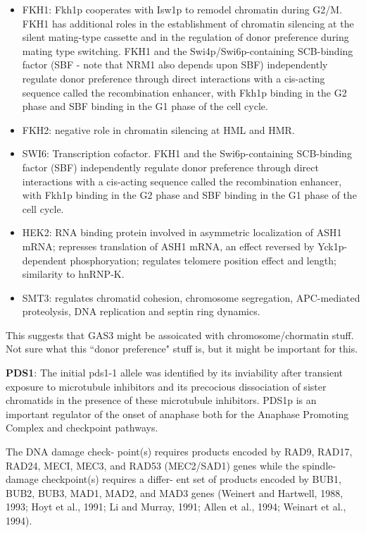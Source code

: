 \documentclass[]{article}
\begin{document}
\begin{itemize}
	\item FKH1: Fkh1p cooperates with Isw1p to remodel chromatin during G2/M. FKH1 has additional roles in the establishment of chromatin silencing at the silent mating-type cassette and in the regulation of donor preference during mating type switching. FKH1 and the Swi4p/Swi6p-containing SCB-binding factor (SBF - note that NRM1 also depends upon SBF) independently regulate donor preference through direct interactions with a cis-acting sequence called the recombination enhancer, with Fkh1p binding in the G2 phase and SBF binding in the G1 phase of the cell cycle. 
	\item FKH2: negative role in chromatin silencing at HML and HMR.
	\item SWI6: Transcription cofactor. FKH1 and the Swi6p-containing SCB-binding factor (SBF) independently regulate donor preference through direct interactions with a cis-acting sequence called the recombination enhancer, with Fkh1p binding in the G2 phase and SBF binding in the G1 phase of the cell cycle.
	\item HEK2: RNA binding protein involved in asymmetric localization of ASH1 mRNA; represses translation of ASH1 mRNA, an effect reversed by Yck1p-dependent phosphoryation; regulates telomere position effect and length; similarity to hnRNP-K.
	\item SMT3: regulates chromatid cohesion, chromosome segregation, APC-mediated proteolysis, DNA replication and septin ring dynamics.
\end{itemize}
This suggests that GAS3 might be assoicated with chromosome/chormatin stuff. Not sure what this ``donor preference" stuff is, but it might be important for this.

\textbf{PDS1}: The initial pds1-1 allele was identified by its inviability after transient exposure to microtubule inhibitors and its precocious dissociation of sister chromatids in the presence of these microtubule inhibitors. PDS1p is an important regulator of the onset of anaphase both for the Anaphase Promoting Complex and checkpoint pathways. \citep{yamamoto1996pds1p}

The DNA damage check- point(s)  requires products encoded by RAD9,  RAD17, RAD24, MECI, MEC3, and RAD53 (MEC2/SAD1) genes while the spindle-damage checkpoint(s) requires a  differ- ent set of products encoded by BUB1, BUB2, BUB3, MAD1,  MAD2, and MAD3 genes (Weinert and Hartwell, 1988, 1993; Hoyt et al.,  1991; Li and Murray, 1991; Allen et al., 1994; Weinart et al., 1994). \citep{yamamoto1996pds1p}
\end{document}
